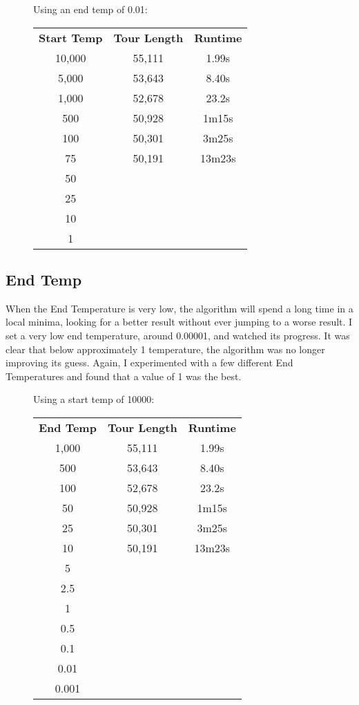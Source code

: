 \documentclass[a4paper, 11pt,table]{article}
\begin{document}
	
	\begin{figure}
	\begin{center}%
		Using an end temp of 0.01:
		\begin{tabu}{|c c c|}
			\textbf{Start Temp} & \textbf{Tour Length} & \textbf{Runtime} \\
			10,000 & 55,111 & 1.99s \\
			5,000 & 53,643 & 8.40s \\
			1,000 & 52,678 & 23.2s \\
			500 & 50,928 & 1m15s \\
			100 & 50,301 & 3m25s \\
			75 & 50,191 & 13m23s \\
			50&&\\
			25&&\\
			10&&\\
			1&&\\
		\end{tabu}
	\end{center}
\end{figure}
	
	\subsection{End Temp}
	When the End Temperature is very low, the algorithm will spend a long time in a local minima, looking for a better result without ever jumping to a worse result. I set a very low end temperature, around 0.00001, and watched its progress. It was clear that below approximately 1 temperature, the algorithm was no longer improving its guess. Again, I experimented with a few different End Temperatures and found that a value of 1 was the best.
	
\begin{figure}
	\begin{center}%
		Using a start temp of 10000:
		\begin{tabu}{|c c c|}
			\textbf{End Temp} & \textbf{Tour Length} & \textbf{Runtime} \\
			1,000 & 55,111 & 1.99s \\
			500 & 53,643 & 8.40s \\
			100 & 52,678 & 23.2s \\
			50 & 50,928 & 1m15s \\
			25 & 50,301 & 3m25s \\
			10 & 50,191 & 13m23s \\
			5&&\\
			2.5&&\\
			1&&\\
			0.5&&\\
			0.1&&\\
			0.01&&\\
			0.001&&\\
		\end{tabu}
	\end{center}
\end{figure}
	
\end{document}

